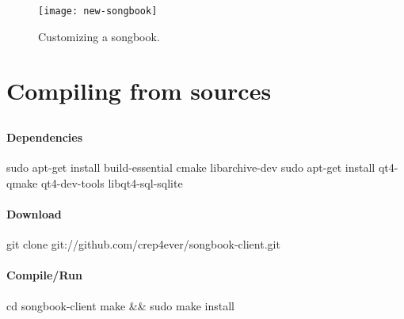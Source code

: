 \begin{figure}
  \centering
  \texttt{[image: new-songbook]}
  \caption{Customizing a songbook.}
  \label{fig:new-songbook}
\end{figure}

\section{Compiling from sources}

\subsection{\linux}

\paragraph{Dependencies}

\begin{unix}
  sudo apt-get install build-essential cmake libarchive-dev
  sudo apt-get install qt4-qmake qt4-dev-tools libqt4-sql-sqlite
\end{unix}

\paragraph{Download}

\begin{unix}
  git clone git://github.com/crep4ever/songbook-client.git
\end{unix}

\paragraph{Compile/Run}

\begin{unix}
  cd songbook-client
  make && sudo make install
\end{unix}

\subsection{\windows}


